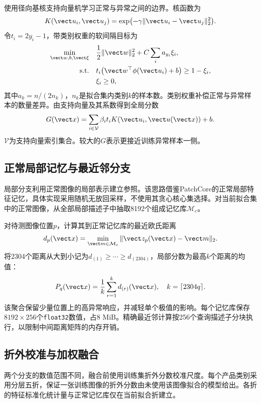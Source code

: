 使用径向基核支持向量机学习正常与异常之间的边界\cite{svc}。核函数为
\begin{equation}
 K(\vect u_i,\vect u_j)=\exp\bigl(-\gamma\|\vect u_i-\vect u_j\|_2^2\bigr).
 \label{eq:kernel}
\end{equation}
令$t_i=2y_i-1$，带类别权重的软间隔目标为
\begin{equation}
\begin{aligned}
 \min_{\vect w,b,\vect\xi}\quad&\frac12\|\vect w\|_2^2+C\sum_i a_{y_i}\xi_i,\\
 \text{s.t.}\quad&t_i\bigl(\vect w^\top\phi(\vect u_i)+b\bigr)\geq1-\xi_i,\\
 &\xi_i\geq0,
\end{aligned}
\label{eq:svm}
\end{equation}
其中$a_k=n/(2n_k)$，$n_k$是拟合集内类别$k$的样本数。类别权重补偿正常与异常样本的数量差异。由支持向量及其系数得到全局分数
\begin{equation}
 G(\vect x)=\sum_{i\in\mathcal V}\beta_i t_i
 K(\vect u_i,\vect u(\vect x))+b.
 \label{eq:gscore}
\end{equation}
$\mathcal V$为支持向量索引集合。较大的$G$表示更接近训练异常样本一侧。

\subsection{正常局部记忆与最近邻分支}
局部分支利用正常图像的局部表示建立参照。该思路借鉴PatchCore的正常局部特征记忆\cite{roth2022}，具体实现采用随机无放回采样，不使用其贪心核心集选择。对当前拟合集中的正常图像，从全部局部描述子中抽取8192个组成记忆库$\mathcal M_c$。

对待测图像位置$p$，计算其到正常记忆库的最近欧氏距离
\begin{equation}
 d_p(\vect x)=\min_{\vect m\in\mathcal M_c}\|\vect z_p(\vect x)-\vect m\|_2.
 \label{eq:distance}
\end{equation}
将2304个距离从大到小记为$d_{(1)}\geq\cdots\geq d_{(2304)}$，局部分数为最高$k$个距离的均值：
\begin{equation}
 P_q(\vect x)=\frac1k\sum_{r=1}^{k}d_{(r)}(\vect x),\quad
 k=\lceil2304q\rceil.
 \label{eq:local}
\end{equation}
该聚合保留少量位置上的高异常响应，并减轻单个极值的影响。每个记忆库保存$8192\times256$个\texttt{float32}数值，占8 MiB。精确最近邻计算按256个查询描述子分块执行，以限制中间距离矩阵的内存开销。

\subsection{折外校准与加权融合}
两个分支的数值范围不同，融合前使用训练集折外分数校准尺度。每个产品类别采用分层五折，保证一张训练图像的折外分数由未使用该图像拟合的模型给出。各折的特征标准化统计量与正常记忆库仅在当前拟合折建立。

